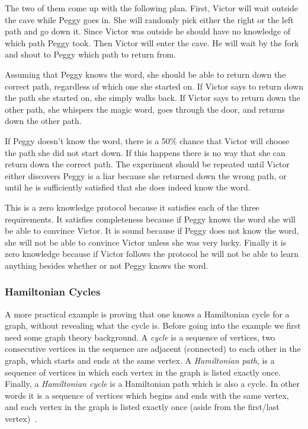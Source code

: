 \documentclass{sig-alternate}
\begin{document}
	The two of them come up with the following plan. First, Victor will wait
	outside the cave while Peggy goes in. She will randomly pick either the
	right or the left path and go down it. Since Victor was outside he
	should have no knowledge of which path Peggy took. Then Victor will
	enter the cave. He will wait by the fork and shout to Peggy which
	path to return from. 
	
	Assuming that Peggy knows the word, she should be able to return down
	the correct path, regardless of which one she started on. If Victor 
	says to	return down the path she started on, she simply walks back. 
	If Victor says to return down the other path, she whispers the magic
	word, goes through the door, and returns down the other path.

	If Peggy doesn't know the word, there is a 50\% chance that Victor
	will choose the path she did not start down. If this happens there is
	no way that she can return down the correct path. The experiment should
	be repeated until Victor either discovers Peggy is a liar because she
	returned down the wrong path, or until he is sufficiently satisfied
	that she does indeed know the word.

	This is a zero knowledge protocol because it satisfies each of the three
	requirements. It satisfies completeness because	if Peggy knows the word
	she will be able to convince Victor. It is sound because if Peggy does not 
	know the word, she will not be able to convince Victor unless she was very
	lucky. Finally it is zero knowledge because if Victor follows the protocol
	he will not be able to learn anything besides whether or not Peggy knows 
	the word.
	
	\subsubsection{Hamiltonian Cycles}
	A more practical example is proving that one knows a Hamiltonian
	cycle for a graph, without revealing what the cycle is. Before
	going into the example we first need some graph theory background.
	A \textit{cycle} is a sequence of vertices, two consecutive vertices
	in the sequence are	adjacent (connected) to each other in the graph,
	which starts and ends at the same vertex. A \textit{Hamiltonian
	path}, is a sequence of vertices in which each vertex in the graph is
	listed exactly once. Finally, a \textit{Hamiltonian cycle}
	is a Hamiltonian path which is also a cycle. In other words it is a
	sequence of vertices which begins and ends with the same vertex, and
	each vertex in the graph is listed exactly once (aside from the first/last
	vertex)~\cite{Wiki:Hamiltonian}.
	
\end{document}
